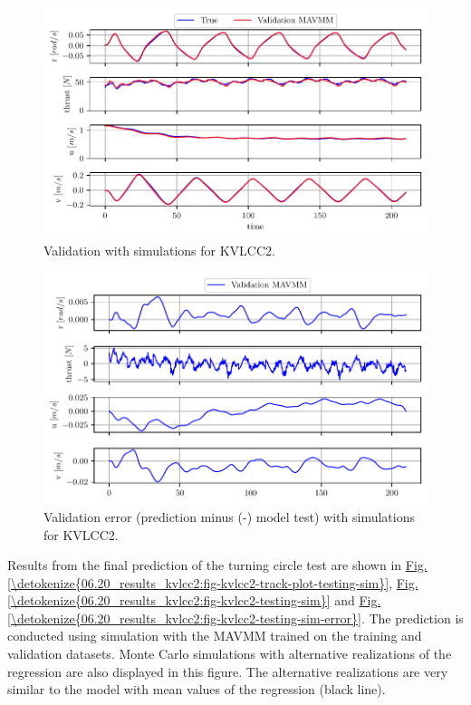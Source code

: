\begin{figure}[h]
\centering
\includegraphics[width=1.0\textwidth]{kappa/images/15.pdf}
\caption{Validation with simulations for KVLCC2.}\label{\detokenize{06.20_results_kvlcc2:fig-kvlcc2-validation-sim}}\end{figure}
\begin{figure}[h]
\centering
\includegraphics[width=1.0\textwidth]{kappa/images/16.pdf}
\caption{Validation error (prediction minus (-) model test) with simulations for KVLCC2.}\label{\detokenize{06.20_results_kvlcc2:fig-kvlcc2-validation-sim-error}}\end{figure}
\clearpage
\noindent Results from the final prediction of the turning circle test are shown in  \hyperref[\detokenize{06.20_results_kvlcc2:fig-kvlcc2-track-plot-testing-sim}]{Fig.\@ \ref{\detokenize{06.20_results_kvlcc2:fig-kvlcc2-track-plot-testing-sim}}}, \hyperref[\detokenize{06.20_results_kvlcc2:fig-kvlcc2-testing-sim}]{Fig.\@ \ref{\detokenize{06.20_results_kvlcc2:fig-kvlcc2-testing-sim}}} and \hyperref[\detokenize{06.20_results_kvlcc2:fig-kvlcc2-testing-sim-error}]{Fig.\@ \ref{\detokenize{06.20_results_kvlcc2:fig-kvlcc2-testing-sim-error}}}. The prediction is conducted using simulation with the MAVMM trained on the training and validation datasets. Monte Carlo simulations with alternative realizations of the regression are also displayed in this figure. The alternative realizations are very similar to the model with mean values of the regression (black line).
